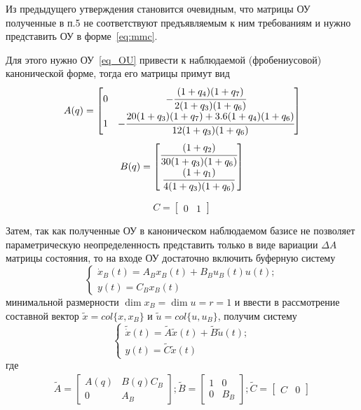 Из предыдущего утверждения становится очевидным, что матрицы ОУ полученные в п.5 не соответствуют предъявляемым к ним требованиям и нужно представить ОУ в форме~\ref{eq:mmc}.

Для этого нужно ОУ~\ref{eq_OU} привести к наблюдаемой (фробениусовой) канонической форме, тогда его матрицы примут вид
\begin{equation}\label{Aqn}
	A(q) =
	\begin{bmatrix}
	0 & - \cfrac{(1+q_4)(1+q_7)}{2(1+q_3)(1+q_6)} \\
	1 &-\cfrac{20(1+q_3)(1+q_7)+3.6(1+q_4)(1+q_6)}{12(1+q_3)(1+q_6)}
	\end{bmatrix}
\end{equation}
\begin{equation}\label{Bqn}
	B(q) =
	\begin{bmatrix}
		\cfrac{(1 + q_2)}{30(1+q_3)(1+q_6)}\\
		\cfrac{(1 + q_1)}{4(1+q_3)(1+q_6)} 
	\end{bmatrix}
\end{equation}

\begin{equation}\label{Cqn}
	C =
	\begin{bmatrix}
	0 & 1
	\end{bmatrix}
\end{equation}

Затем, так как полученные ОУ в каноническом наблюдаемом базисе не позволяет параметрическую неопределенность представить только в виде вариации $\Delta A$ матрицы
состояния, то на входе ОУ достаточно включить буферную систему~\cite{NSUsh}
\begin{equation}
	\begin{cases}
		{\dot x_B} (t) = A_B x_B(t) + B_B u_B(t) u(t);\\
		y(t) = C_B x_B(t)
	\end{cases}
\end{equation}
минимальной размерности $\dim x_B = \dim u = r = 1$ и ввести в рассмотрение составной вектор $\tilde{x} = col\{x, x_B\}$ и $\tilde{u} = col\{u, u_B\}$, получим систему
\begin{equation}
	\begin{cases}
		\tilde{\dot x} (t) = \tilde{A} \tilde{x}(t) + \tilde{B} \tilde{u}(t);\\
		y(t) = \tilde{C} \tilde{x}(t)
	\end{cases}
\end{equation}
где
\begin{align}
	\tilde{A} =
	\begin{bmatrix}
	 A(q) & B(q) C_B\\
	 0 & A_B
	\end{bmatrix};
	\tilde{B} = 
	\begin{bmatrix}
		1&0\\
		0&B_B
	\end{bmatrix};
	\tilde{C} = 
	\begin{bmatrix}
		C & 0
	\end{bmatrix}
\end{align}

